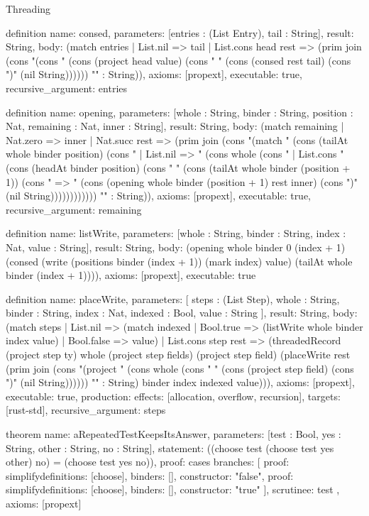 \begin{lexlean}{Threading}
\begin{semanticmodule}
definition{
  name: consed,
  parameters: [entries : (List Entry), tail : String],
  result: String,
  body: (match entries
    | List.nil => tail
    | List.cons head rest => (prim join (cons "(cons " (cons (project head value) (cons " " (cons (consed rest tail) (cons ")" (nil String)))))) "" : String)),
  axioms: [propext],
  executable: true,
  recursive_argument: entries
}

definition{
  name: opening,
  parameters: [whole : String, binder : String, position : Nat, remaining : Nat, inner : String],
  result: String,
  body: (match remaining
    | Nat.zero => inner
    | Nat.succ rest => (prim join (cons "(match " (cons (tailAt whole binder position) (cons " | List.nil => " (cons whole (cons " | List.cons " (cons (headAt binder position) (cons " " (cons (tailAt whole binder (position + 1)) (cons " => " (cons (opening whole binder (position + 1) rest inner) (cons ")" (nil String)))))))))))) "" : String)),
  axioms: [propext],
  executable: true,
  recursive_argument: remaining
}

definition{
  name: listWrite,
  parameters: [whole : String, binder : String, index : Nat, value : String],
  result: String,
  body: (opening whole binder 0 (index + 1) (consed (write (positions binder (index + 1)) (mark index) value) (tailAt whole binder (index + 1)))),
  axioms: [propext],
  executable: true
}

definition{
  name: placeWrite,
  parameters: [
    steps : (List Step),
    whole : String,
    binder : String,
    index : Nat,
    indexed : Bool,
    value : String
  ],
  result: String,
  body: (match steps
    | List.nil => (match indexed
      | Bool.true => (listWrite whole binder index value)
      | Bool.false => value)
    | List.cons step rest => (threadedRecord (project step ty) whole (project step fields) (project step field) (placeWrite rest (prim join (cons "(project " (cons whole (cons " " (cons (project step field) (cons ")" (nil String)))))) "" : String) binder index indexed value))),
  axioms: [propext],
  executable: true,
  production: {effects: [allocation, overflow, recursion], targets: [rust-std]},
  recursive_argument: steps
}

theorem{
  name: aRepeatedTestKeepsItsAnswer,
  parameters: [test : Bool, yes : String, other : String, no : String],
  statement: ((choose test (choose test yes other) no) = (choose test yes no)),
  proof: cases{
    branches: [
      {proof: simplify{definitions: [choose]}, binders: [], constructor: "false"},
      {proof: simplify{definitions: [choose]}, binders: [], constructor: "true"}
    ],
    scrutinee: test
  },
  axioms: [propext]
}


\end{semanticmodule}
\end{lexlean}
